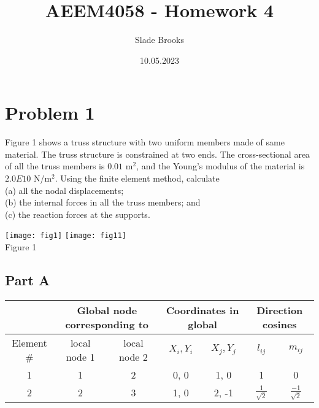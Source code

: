 \documentclass{article}
\title{AEEM4058 - Homework 4}
\author{Slade Brooks}
\date{10.05.2023}
\begin{document}
\maketitle

\section*{Problem 1}
Figure 1 shows a truss structure with two uniform members made of same material.
The truss structure is constrained at two ends. The cross-sectional area of all the
truss members is $0.01$ m$^2$, and the Young’s modulus of
the material is $2.0E10$ N/m$^2$. Using the finite element method, calculate \\
(a) all the nodal displacements; \\
(b) the internal forces in all the truss members; and \\
(c) the reaction forces at the supports.
\begin{center}
    \texttt{[image: fig1]} \texttt{[image: fig11]} \\
    Figure 1
\end{center}
\subsection*{Part A}
\begin{tabular}{|c|c|c|c|c|c|c|}
    \hline
    & \multicolumn{2}{|c|}{Global node corresponding to} &
    \multicolumn{2}{|c|}{Coordinates in global} & 
    \multicolumn{2}{|c|}{Direction cosines} \\
    \hline
    Element \# & local node 1 & local node 2 & $X_i, Y_i$ & $X_j, Y_j$ & $l_{ij}$ & $m_{ij}$ \\
    \hline
    1 & 1 & 2 & 0, 0 & 1, 0 & 1 & 0 \\
    2 & 2 & 3 & 1, 0 & 2, -1 & $\frac{1}{\sqrt{2}}$ & $\frac{-1}{\sqrt{2}}$ \\
    \hline
\end{tabular}
\end{document}
